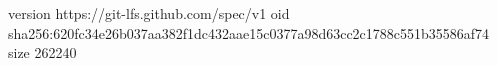 version https://git-lfs.github.com/spec/v1
oid sha256:620fc34e26b037aa382f1dc432aae15c0377a98d63cc2c1788c551b35586af74
size 262240

